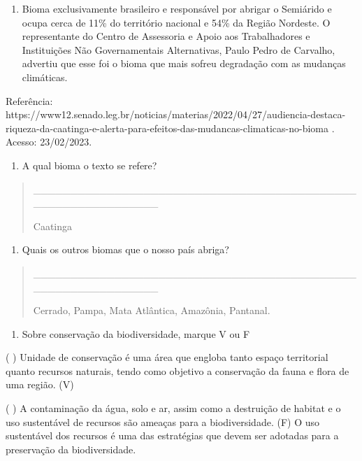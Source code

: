 \begin{enumerate}
\def\labelenumi{\arabic{enumi}.}
\item
  Bioma exclusivamente brasileiro e responsável por abrigar o Semiárido
  e ocupa cerca de 11\% do território nacional e 54\% da Região
  Nordeste. O representante do Centro de Assessoria e Apoio aos
  Trabalhadores e Instituições Não Governamentais Alternativas, Paulo
  Pedro de Carvalho, advertiu que esse foi o bioma que mais sofreu
  degradação com as mudanças climáticas.
\end{enumerate}

Referência:
https://www12.senado.leg.br/noticias/materias/2022/04/27/audiencia-destaca-riqueza-da-caatinga-e-alerta-para-efeitos-das-mudancas-climaticas-no-bioma
. Acesso: 23/02/2023.

\begin{enumerate}
\def\labelenumi{\alph{enumi})}
\item
  A qual bioma o texto se refere?
\end{enumerate}

\begin{quote}
\_\_\_\_\_\_\_\_\_\_\_\_\_\_\_\_\_\_\_\_\_\_\_\_\_\_\_\_\_\_\_\_\_\_\_\_\_\_\_\_\_\_\_\_\_\_\_\_\_\_\_\_\_\_\_\_\_\_\_\_\_

Caatinga
\end{quote}

\begin{enumerate}
\def\labelenumi{\alph{enumi})}
\item
  Quais os outros biomas que o nosso país abriga?
\end{enumerate}

\begin{quote}
\_\_\_\_\_\_\_\_\_\_\_\_\_\_\_\_\_\_\_\_\_\_\_\_\_\_\_\_\_\_\_\_\_\_\_\_\_\_\_\_\_\_\_\_\_\_\_\_\_\_\_\_\_\_\_\_\_\_\_\_\_

Cerrado, Pampa, Mata Atlântica, Amazônia, Pantanal.
\end{quote}

\begin{enumerate}
\def\labelenumi{\arabic{enumi}.}
\item
  Sobre conservação da biodiversidade, marque V ou F
\end{enumerate}

( ) Unidade de conservação é uma área que engloba tanto espaço
territorial quanto recursos naturais, tendo como objetivo a conservação
da fauna e flora de uma região. (V)

( ) A contaminação da água, solo e ar, assim como a destruição de
habitat e o uso sustentável de recursos são ameaças para a
biodiversidade. (F) O uso sustentável dos recursos é uma das estratégias
que devem ser adotadas para a preservação da biodiversidade.

